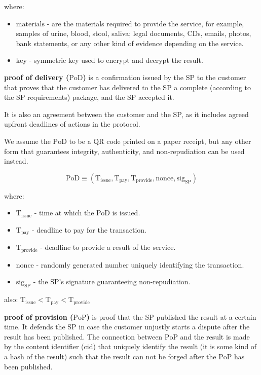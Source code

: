 \documentclass{ieeeaccess}
\begin{document}
where:

\begin{itemize}

\item $\mathrm{materials}$ - are the materials required to provide the service, for example, samples of urine, blood, stool, saliva; legal documents, CDs, emails, photos, bank statements, or any other kind of evidence depending on the service.
\item $\mathrm{key}$ - symmetric key used to encrypt and decrypt the result.
\end{itemize}

\noindent \textbf
{proof of delivery ($\mathrm{PoD}$)}\label{proof-of-delivery} is a  confirmation issued by the SP to the customer that proves that the customer has delivered to the SP a complete (according to the SP requirements) package, and the SP accepted it.

It is also an agreement between the customer and the SP, as it includes agreed upfront deadlines of actions in the protocol.

We assume the $\mathrm{PoD}$ to be a QR code printed on a paper receipt, but any other form that guarantees integrity, authenticity, and non-repudiation can be used instead. 

$$\mathrm{PoD} \equiv (\mathrm{T}_\mathrm{issue}, \mathrm{T}_\mathrm{pay}, \mathrm{T}_\mathrm{provide}, \mathrm{nonce}, \mathrm{sig}_\mathrm{SP})$$

where:

\begin{itemize}

\item $\mathrm{T}_\mathrm{issue}$ - time at which the PoD is issued.
\item
  $\mathrm{T}_\mathrm{pay}$ - deadline to pay for the transaction.
\item
  $\mathrm{T}_\mathrm{provide}$ - deadline to provide a result of the service.
\item $\mathrm{nonce}$ - randomly generated number uniquely identifying the transaction.
\item $\mathrm{sig}_\mathrm{SP}$ - the SP's signature guaranteeing non-repudiation.
\end{itemize}

also:
\(\mathrm{T}_\mathrm{issue} < \mathrm{T}_\mathrm{pay} < \mathrm{T}_\mathrm{provide}\)

\noindent \textbf
{proof of provision ($\mathrm{PoP}$)}\label{proof-of-provision} is proof that the SP published the result at a certain time. It defends the SP in case the customer unjustly starts a dispute after the result has been published. The connection between $\mathrm{PoP}$ and the result is made by the content identifier ($\mathrm{cid}$) that uniquely identify the result (it is some kind of a hash of the result) such that the result can not be forged after the $\mathrm{PoP}$ has been published.
\end{document}
